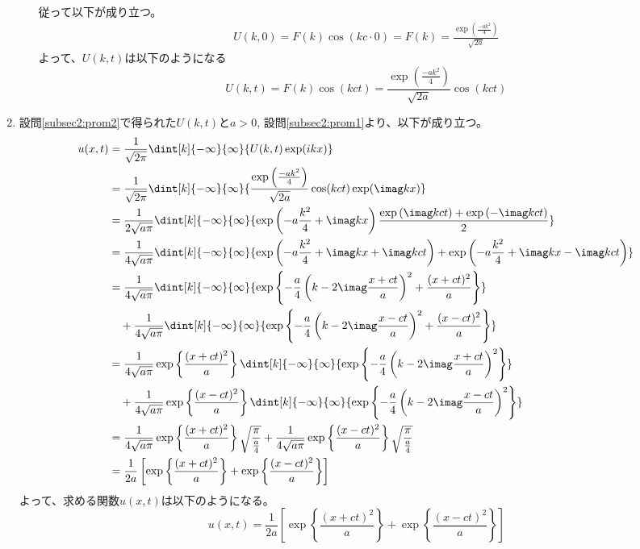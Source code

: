 \documentclass[dvipdfmx,titlepage, 11pt, a4paper]{jsarticle}%
\begin{document}
\begin{enumerate}[(1)]
\begin{enumerate}[(i)]
\begin{align*}
        \end{align*}
        従って以下が成り立つ。
        \begin{align*}
            U(k, 0) = F(k)\cos(kc\cdot 0) = F(k) = \frac{\exp\left(\frac{-ak^2}{4}\right)}{\sqrt{2a}}
        \end{align*}
        よって、$U(k, t)$は以下のようになる
        \begin{equation}
            U(k, t) = F(k)\cos(kct) = \frac{\exp\left(\frac{-ak^2}{4}\right)}{\sqrt{2a}}\cos(kct)
        \end{equation}
    \end{enumerate}
    \item 設問\eqref{subsec2:prom2}で得られた$U(k, t)$と$a > 0$, 設問\eqref{subsec2:prom1}より、以下が成り立つ。
    \begin{align*}
        u(x, t) &= \frac{1}{\sqrt{2\pi}}\dint[k]{-\infty}{\infty}{U(k, t)\exp(ikx)}\\
        &= \frac{1}{\sqrt{2\pi}}\dint[k]{-\infty}{\infty}{\frac{\exp\left(\frac{-ak^2}{4}\right)}{\sqrt{2a}}\cos(kct)\exp(\imag kx)}\\
        &= \frac{1}{2\sqrt{a\pi}}\dint[k]{-\infty}{\infty}{\exp\left(-a\frac{k^2}{4} + \imag kx\right)\frac{\exp\left(\imag kct\right) + \exp\left(-\imag kct\right)}{2}}\\
        &= \frac{1}{4\sqrt{a\pi}}\dint[k]{-\infty}{\infty}{\exp\left(-a\frac{k^2}{4} + \imag kx + \imag kct\right) + \exp\left(-a\frac{k^2}{4} + \imag kx - \imag kct\right)}\\
        &= \frac{1}{4\sqrt{a\pi}}\dint[k]{-\infty}{\infty}{\exp\left\{-\frac{a}{4}\left(k - 2\imag \frac{x + ct}{a}\right)^2 + \frac{(x + ct)^2}{a}\right\}}\\
        &\quad+ \frac{1}{4\sqrt{a\pi}}\dint[k]{-\infty}{\infty}{\exp\left\{-\frac{a}{4}\left(k - 2\imag \frac{x - ct}{a}\right)^2 + \frac{(x - ct)^2}{a}\right\}}\\
        &= \frac{1}{4\sqrt{a\pi}}\exp\left\{\frac{(x + ct)^2}{a}\right\}\dint[k]{-\infty}{\infty}{\exp\left\{-\frac{a}{4}\left(k - 2\imag \frac{x + ct}{a}\right)^2\right\}}\\
        &\quad+ \frac{1}{4\sqrt{a\pi}}\exp\left\{\frac{(x - ct)^2}{a}\right\}\dint[k]{-\infty}{\infty}{\exp\left\{-\frac{a}{4}\left(k - 2\imag \frac{x - ct}{a}\right)^2\right\}}\\
        &= \frac{1}{4\sqrt{a\pi}}\exp\left\{\frac{(x + ct)^2}{a}\right\}\sqrt{\frac{\pi}{\frac{a}{4}}} + \frac{1}{4\sqrt{a\pi}}\exp\left\{\frac{(x - ct)^2}{a}\right\}\sqrt{\frac{\pi}{\frac{a}{4}}}\\
        &= \frac{1}{2a}\left[\exp\left\{\frac{(x + ct)^2}{a}\right\} + \exp\left\{\frac{(x - ct)^2}{a}\right\}\right]
    \end{align*}
    よって、求める関数$u(x, t)$は以下のようになる。
    \begin{equation*}
        u(x, t) = \frac{1}{2a}\left[\exp\left\{\frac{(x + ct)^2}{a}\right\} + \exp\left\{\frac{(x - ct)^2}{a}\right\}\right]
    \end{equation*}
\end{enumerate}
\end{document}
